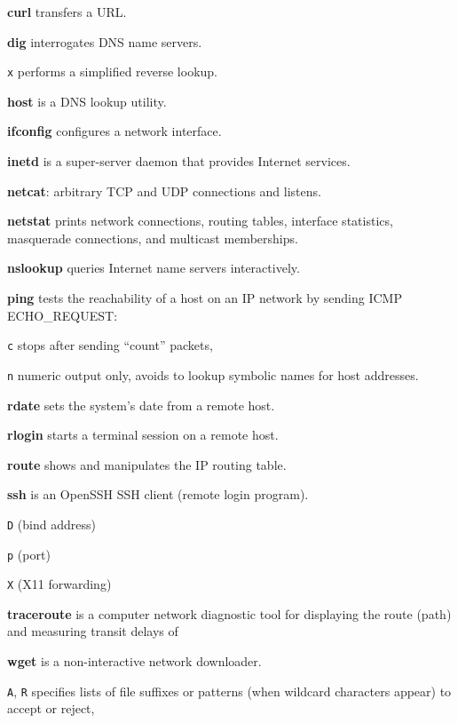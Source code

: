 \begin{enumx}
\item [\cmd] \textbf{curl} transfers a URL.
\item [\cmd] \textbf{dig} interrogates DNS name servers.                        
\item [\texttt{x}] performs a simplified reverse lookup. 
\item [\cmd] \textbf{host} is a DNS lookup utility.  
\item [\cmd] \textbf{ifconfig} configures a network interface.   
\item [\cmd] \textbf{inetd} is a super-server daemon that provides Internet services.
\item [\cmd] \textbf{netcat}: arbitrary TCP and UDP connections and listens.
\item [\cmd] \textbf{netstat} prints network connections, routing tables, 
interface statistics, masquerade connections, and multicast memberships.
\item [\cmd] \textbf{nslookup} queries Internet name servers interactively.
\item [\cmd] \textbf{ping} tests the reachability of a host 
on an IP network by sending ICMP ECHO\_REQUEST:
\item [\texttt{c}] stops after sending ``count'' packets,
\item [\texttt{n}] numeric output only, 
	avoids to lookup symbolic names for host addresses. 
\item [\cmd] \textbf{rdate} sets the system's date from a remote host.
\item [\cmd] \textbf{rlogin} starts a terminal session on a remote host.
\item [\cmd] \textbf{route} shows and manipulates the IP routing table.
\item [\cmd] \textbf{ssh} is an OpenSSH SSH client (remote login program).
\item [\texttt{D}] (bind address)
\item [\texttt{p}] (port)
\item [\texttt{X}] (X11 forwarding)
\item [\cmd] \textbf{traceroute} is a computer network diagnostic tool for 
displaying the route (path) and measuring transit delays of 
\item [\cmd] \textbf{wget} is a non-interactive network downloader.
\item [\texttt{A}, \texttt{R}] specifies lists 	of file suffixes or 
	patterns (when wildcard characters appear) to accept or reject,

\end{enumx}
